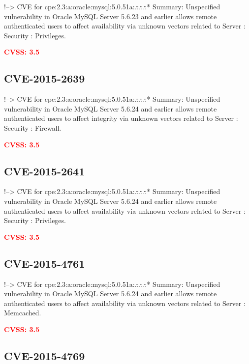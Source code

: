 \documentclass[a4paper, 12pt]{article}
\begin{document}
!--\textgreater{} CVE for
cpe:2.3:a:oracle:mysql:5.0.51a:\emph{:}:\emph{:}:\emph{:}:* Summary:
Unspecified vulnerability in Oracle MySQL Server 5.6.23 and earlier
allows remote authenticated users to affect availability via unknown
vectors related to Server : Security : Privileges.

\textbf{\textcolor{red}{CVSS: 3.5}}

\hypertarget{cve-2015-2639}{%
\subsection{CVE-2015-2639}\label{cve-2015-2639}}

!--\textgreater{} CVE for
cpe:2.3:a:oracle:mysql:5.0.51a:\emph{:}:\emph{:}:\emph{:}:* Summary:
Unspecified vulnerability in Oracle MySQL Server 5.6.24 and earlier
allows remote authenticated users to affect integrity via unknown
vectors related to Server : Security : Firewall.

\textbf{\textcolor{red}{CVSS: 3.5}}

\hypertarget{cve-2015-2641}{%
\subsection{CVE-2015-2641}\label{cve-2015-2641}}

!--\textgreater{} CVE for
cpe:2.3:a:oracle:mysql:5.0.51a:\emph{:}:\emph{:}:\emph{:}:* Summary:
Unspecified vulnerability in Oracle MySQL Server 5.6.24 and earlier
allows remote authenticated users to affect availability via unknown
vectors related to Server : Security : Privileges.

\textbf{\textcolor{red}{CVSS: 3.5}}

\hypertarget{cve-2015-4761}{%
\subsection{CVE-2015-4761}\label{cve-2015-4761}}

!--\textgreater{} CVE for
cpe:2.3:a:oracle:mysql:5.0.51a:\emph{:}:\emph{:}:\emph{:}:* Summary:
Unspecified vulnerability in Oracle MySQL Server 5.6.24 and earlier
allows remote authenticated users to affect availability via unknown
vectors related to Server : Memcached.

\textbf{\textcolor{red}{CVSS: 3.5}}

\hypertarget{cve-2015-4769}{%
\subsection{CVE-2015-4769}\label{cve-2015-4769}}
\end{document}
